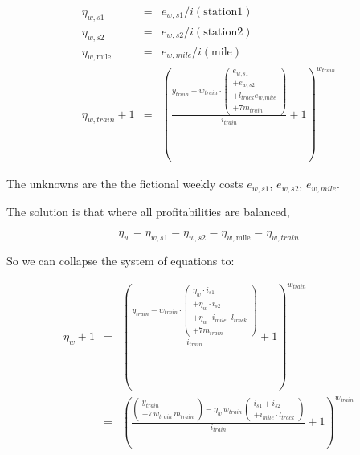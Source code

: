 \documentclass[12pt]{article}
\begin{document}
\begin{eqnarray}
\eta_{w,\mathit{s1}} &=& e_{w,\mathit{s1}}
                                         / i\left(\mathrm{station1}\right) \\
\eta_{w,\mathit{s2}} &=& e_{w,\mathit{s2}}
                                         / i\left(\mathrm{station2}\right) \\
\eta_{w,\mathrm{mile}} &=& e_{w,\mathit{mile}}
                                         / i\left(\mathrm{mile}\right) \\
\eta_{w,\mathit{train}} + 1  
  &=& 
    \left( 
      \frac{ 
        y_\mathit{train} 
        - w_\mathit{train} \cdot \left( \begin{array}{c} 
          e_{w,\mathit{s1}} \\ 
          + e_{w,\mathit{s2}} \\ 
          + l_\mathit{track} e_{w,\mathit{mile}} \\ 
          + 7  m_\mathit{train} 
        \end{array} \right)
      }{ i_\mathit{train} } +1 
    \right) ^{w_\mathit{train}}
\end{eqnarray}


The unknowns are the the fictional weekly costs $e_{w,\mathit{s1}}$, $e_{w,\mathit{s2}}$, $e_{w,\mathit{mile}}$.

The solution is that where all profitabilities are balanced,

\begin{equation}
\eta_w = \eta_{w,\mathit{s1}} = \eta_{w,\mathit{s2}} = \eta_{w,\mathrm{mile}} = \eta_{w,\mathit{train}}
\end{equation}

So we can collapse the system of equations to:

\begin{eqnarray}
\eta_w + 1  
  &=& 
    \left( 
      \frac{ 
        y_\mathit{train} 
        - w_\mathit{train} \cdot \left( \begin{array}{c} 
          \eta_w \cdot i_\mathit{s1} \\ 
          + \eta_w \cdot i_\mathit{s2} \\ 
          + \eta_w \cdot i_\mathit{mile} \cdot l_\mathit{track} \\ 
          + 7  m_\mathit{train} 
        \end{array} \right)
      }{ i_\mathit{train} } +1 
    \right) ^{w_\mathit{train}} \\
  &=& 
    \left( 
      \frac{ 
        \left( \begin{array}{c} 
          y_\mathit{train} \\
          - 7 \, w_\mathit{train} \, m_\mathit{train} 
        \end{array} \right)    
        - \eta_w \, w_\mathit{train} \, \left( \begin{array}{c} 
          i_\mathit{s1} + i_\mathit{s2} \\ 
          + i_\mathit{mile} \cdot l_\mathit{track}
        \end{array} \right)
      }{ i_\mathit{train} } +1 
    \right) ^{w_\mathit{train}}
\end{eqnarray}
\end{document}
